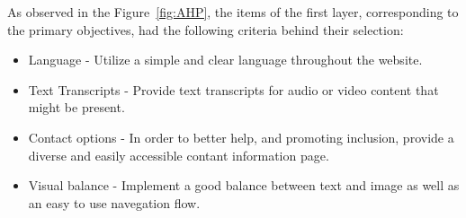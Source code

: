 As observed in the Figure~\ref{fig:AHP}, the items of the first layer, corresponding to the primary objectives, had the following criteria behind their selection:

\begin{itemize}
    \item Language - Utilize a simple and clear language throughout the website.
    \item Text Transcripts - Provide text transcripts for audio or video content that might be present.
    \item Contact options - In order to better help, and promoting inclusion, provide a diverse and easily accessible contant information page.
    \item Visual balance - Implement a good balance between text and image as well as an easy to use navegation flow.
\end{itemize}

